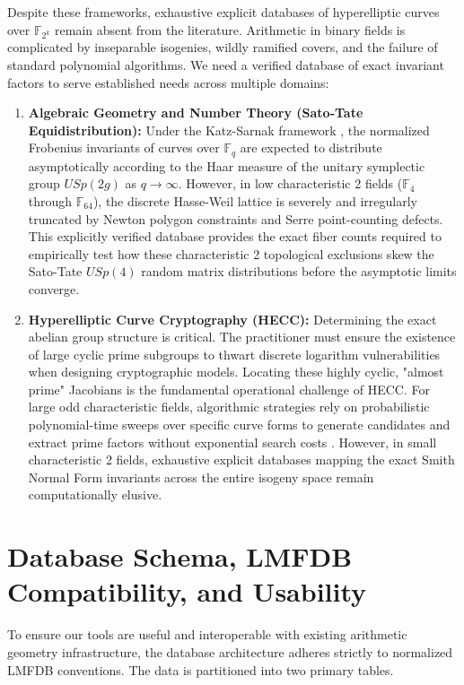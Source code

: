 \documentclass[letterpaper, 11pt]{article}
\begin{document}
Despite these frameworks, exhaustive explicit databases of hyperelliptic curves over $\mathbb{F}_{2^k}$ remain absent from the literature. Arithmetic in binary fields is complicated by inseparable isogenies, wildly ramified covers, and the failure of standard polynomial algorithms. We need a verified database of exact invariant factors to serve established needs across multiple domains:
\begin{enumerate}
    \item \textbf{Algebraic Geometry and Number Theory (Sato-Tate Equidistribution):} Under the Katz-Sarnak framework \cite{Katz1999}, the normalized Frobenius invariants of curves over $\mathbb{F}_q$ are expected to distribute asymptotically according to the Haar measure of the unitary symplectic group $USp(2g)$ as $q \to \infty$. However, in low characteristic 2 fields ($\mathbb{F}_4$ through $\mathbb{F}_{64}$), the discrete Hasse-Weil lattice is severely and irregularly truncated by Newton polygon constraints and Serre point-counting defects. This explicitly verified database provides the exact fiber counts required to empirically test how these characteristic 2 topological exclusions skew the Sato-Tate $USp(4)$ random matrix distributions before the asymptotic limits converge.
    \item \textbf{Hyperelliptic Curve Cryptography (HECC):} Determining the exact abelian group structure is critical. The practitioner must ensure the existence of large cyclic prime subgroups to thwart discrete logarithm vulnerabilities when designing cryptographic models. Locating these highly cyclic, "almost prime" Jacobians is the fundamental operational challenge of HECC. For large odd characteristic fields, algorithmic strategies rely on probabilistic polynomial-time sweeps over specific curve forms to generate candidates and extract prime factors without exponential search costs \cite{Satoh2008}. However, in small characteristic 2 fields, exhaustive explicit databases mapping the exact Smith Normal Form invariants across the entire isogeny space remain computationally elusive.
\end{enumerate}

\section{Database Schema, LMFDB Compatibility, and Usability}
To ensure our tools are useful and interoperable with existing arithmetic geometry infrastructure, the database architecture adheres strictly to normalized LMFDB conventions. The data is partitioned into two primary tables.
\end{document}
